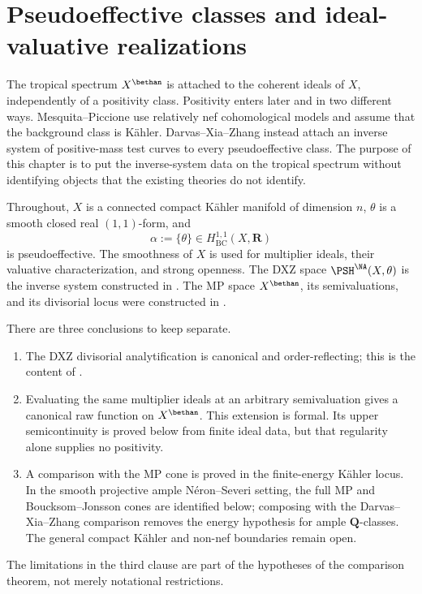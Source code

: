 \chapter{Pseudoeffective classes and ideal-valuative realizations}
\label{chap:pseff-mp-dxz}

The tropical spectrum \(X^{\bethan}\) is attached to the coherent ideals
of \(X\), independently of a positivity class.  Positivity enters later and
in two different ways.  Mesquita--Piccione use relatively nef
cohomological models and assume that the background class is K\"ahler.
Darvas--Xia--Zhang instead attach an inverse system of positive-mass test
curves to every pseudoeffective class.  The purpose of this chapter is to
put the inverse-system data on the tropical spectrum without identifying
objects that the existing theories do not identify.

Throughout, \(X\) is a connected compact K\"ahler manifold of dimension
\(n\), \(\theta\) is a smooth closed real \((1,1)\)-form, and
\[
                    \alpha:=\{\theta\}
       \in H^{1,1}_{\mathrm{BC}}(X,\mathbf R)
\tag{71.1}\label{eq:pseff-background}
\]
is pseudoeffective.  The smoothness of \(X\) is used for multiplier ideals,
their valuative characterization, and strong openness.  The DXZ space
\(\PSH^{\NA}(X,\theta)\) is the inverse system constructed in
.  The MP space \(X^{\bethan}\), its
semivaluations, and its divisorial locus were constructed in
.

There are three conclusions to keep separate.
\begin{enumerate}
\item The DXZ divisorial analytification is canonical and order-reflecting;
      this is the content of \cite[Definition~3.11 and Lemma~4.2]
      {Xia23Operations}.
\item Evaluating the same multiplier ideals at an arbitrary semivaluation
      gives a canonical raw function on \(X^{\bethan}\).  This extension is
      formal.  Its upper semicontinuity is proved below from finite ideal
      data, but that regularity alone supplies no positivity.
\item A comparison with the MP cone is proved in the finite-energy K\"ahler
      locus.  In the smooth projective ample N\'eron--Severi setting, the
      full MP and Boucksom--Jonsson cones are identified below; composing
      with the Darvas--Xia--Zhang comparison removes the energy hypothesis
      for ample \(\mathbf Q\)-classes.  The general compact K\"ahler and
      non-nef boundaries remain open.
\end{enumerate}
The limitations in the third clause are part of the hypotheses of the
comparison theorem, not merely notational restrictions.

